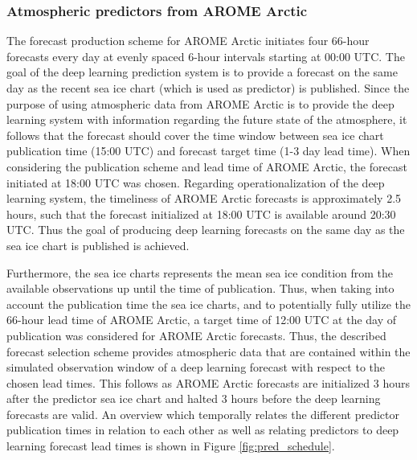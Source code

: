 \documentclass[../main/thesis]{subfiles}
\begin{document}
\subsubsection{Atmospheric predictors from AROME Arctic}
\label{sec:data_arome}
The forecast production scheme for AROME Arctic initiates four 66-hour forecasts every day at evenly spaced 6-hour intervals starting at 00:00 UTC. The goal of the deep learning prediction system is to provide a forecast on the same day as the recent sea ice chart (which is used as predictor) is published. Since the purpose of using atmospheric data from AROME Arctic is to provide the deep learning system with information regarding the future state of the atmosphere, it follows that the forecast should cover the time window between sea ice chart publication time (15:00 UTC) and forecast target time (1-3 day lead time). When considering the publication scheme and lead time of AROME Arctic, the forecast initiated at 18:00 UTC was chosen. Regarding operationalization of the deep learning system, the timeliness of AROME Arctic forecasts is approximately 2.5 hours, such that the forecast initialized at 18:00 UTC is available around 20:30 UTC. Thus the goal of producing deep learning forecasts on the same day as the sea ice chart is published is achieved.

Furthermore, the sea ice charts represents the mean sea ice condition from the available observations up until the time of publication. Thus, when taking into account the publication time the sea ice charts, and to potentially fully utilize the 66-hour lead time of AROME Arctic, a target time of 12:00 UTC at the day of publication was considered for AROME Arctic forecasts. Thus, the described forecast selection scheme provides atmospheric data that are contained within the simulated observation window of a deep learning forecast with respect to the chosen lead times. This follows as AROME Arctic forecasts are initialized 3 hours after the predictor sea ice chart and halted 3 hours before the deep learning forecasts are valid. An overview which temporally relates the different predictor publication times in relation to each other as well as relating predictors to deep learning forecast lead times is shown in Figure \ref{fig:pred_schedule}.
\end{document}
